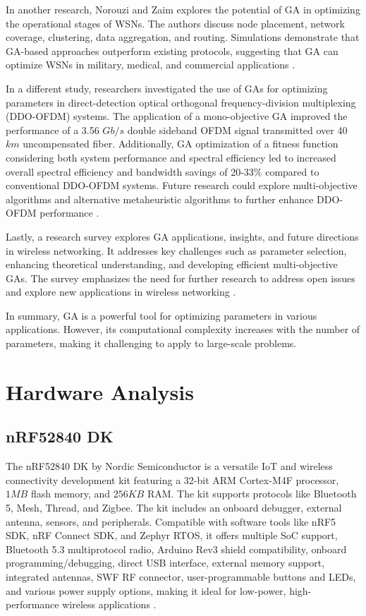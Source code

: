 In another research, Norouzi and Zaim explores the potential of GA in optimizing the operational stages of WSNs. The authors discuss node placement, network coverage, clustering, data aggregation, and routing. Simulations demonstrate that GA-based approaches outperform existing protocols, suggesting that GA can optimize WSNs in military, medical, and commercial applications \cite{norouzi2014genetic}.

In a different study, researchers investigated the use of GAs for optimizing parameters in direct-detection optical orthogonal frequency-division multiplexing (DDO-OFDM) systems. The application of a mono-objective GA improved the performance of a 3.56 $Gb/s$ double sideband OFDM signal transmitted over 40 $km$ uncompensated fiber. Additionally, GA optimization of a fitness function considering both system performance and spectral efficiency led to increased overall spectral efficiency and bandwidth savings of 20-33\% compared to conventional DDO-OFDM systems. Future research could explore multi-objective algorithms and alternative metaheuristic algorithms to further enhance DDO-OFDM performance \cite{rocha2013mono}.

Lastly, a research survey explores GA applications, insights, and future directions in wireless networking. It addresses key challenges such as parameter selection, enhancing theoretical understanding, and developing efficient multi-objective GAs. The survey emphasizes the need for further research to address open issues and explore new applications in wireless networking \cite{mehboob2016genetic}.

In summary, GA is a powerful tool for optimizing parameters in various applications. However, its computational complexity increases with the number of parameters, making it challenging to apply to large-scale problems.


\section{Hardware Analysis}\label{sec:hardware_analysis}
\subsection{nRF52840 DK}
The nRF52840 DK by Nordic Semiconductor is a versatile IoT and wireless connectivity development kit featuring a 32-bit ARM Cortex-M4F processor, $1MB$ flash memory, and $256KB$ RAM. The kit supports protocols like Bluetooth 5, Mesh, Thread, and Zigbee. The kit includes an onboard debugger, external antenna, sensors, and peripherals. Compatible with software tools like nRF5 SDK, nRF Connect SDK, and Zephyr RTOS, it offers multiple SoC support, Bluetooth 5.3 multiprotocol radio, Arduino Rev3 shield compatibility, onboard programming/debugging, direct USB interface, external memory support, integrated antennas, SWF RF connector, user-programmable buttons and LEDs, and various power supply options, making it ideal for low-power, high-performance wireless applications \cite{Semiconductor_Nordic_Product_Brief_2018_2.0}.

